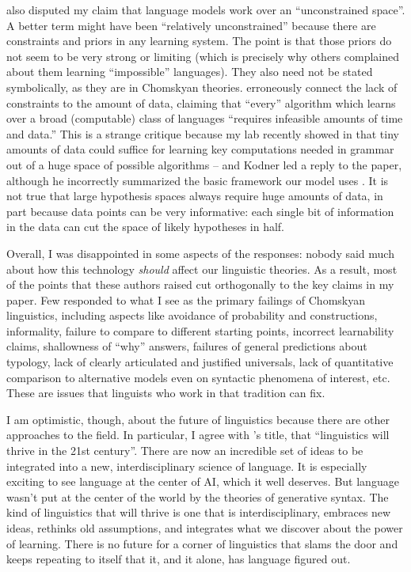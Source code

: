 \documentclass[output=paper,colorlinks,citecolor=brown]{langscibook}
\begin{document}
\citet{kodner2023linguistics} also disputed my claim that language models work over an ``unconstrained space''. A better term might have been ``relatively unconstrained'' because there are constraints and priors in any learning system. The point is that those priors do not seem to be very strong or limiting (which is precisely why others complained about them learning ``impossible'' languages). They also need not be stated symbolically, as they are in Chomskyan theories. \citet{kodner2023linguistics} erroneously connect the lack of constraints to the amount of data, claiming that ``every'' algorithm which learns over a broad (computable) class of languages ``requires infeasible amounts of time and data.'' This is a strange critique because my lab recently showed in \citet{yang2022one} that tiny amounts of data could suffice for learning key computations needed in grammar out of a huge space of possible algorithms -- and Kodner led a reply to the paper,  although he incorrectly summarized the basic framework our model uses \citep{piantadosi2022reply}. It is not true that large hypothesis spaces always require huge amounts of data, in part because data points can be very informative: each single bit of information in the data can cut the space of likely hypotheses in half. 

 
Overall, I was disappointed in some aspects of the responses: nobody said much about how this technology \textit{should} affect our linguistic theories. As a result, most of the points that these authors raised cut orthogonally to the key claims in my paper.  Few responded to what I see as the primary failings of Chomskyan linguistics, including aspects like avoidance of probability and constructions, informality, failure to compare to different starting points, incorrect learnability claims, shallowness of ``why'' answers, failures of general predictions about  typology, lack of clearly articulated and justified universals, lack of quantitative comparison to alternative models even on syntactic phenomena of interest, etc. These are issues that linguists who work in that tradition can fix. 

I am optimistic, though, about the future of linguistics because there are other approaches to the field. In particular, I agree with \citet{kodner2023linguistics}'s title, that ``linguistics will thrive in the 21st century''. There are now an incredible set of ideas to be integrated into a new, interdisciplinary science of language. It is especially exciting to see language at the center of AI, which it well deserves. But language wasn't put at the center of the world by the theories of generative syntax. The kind of linguistics that will thrive is one that is interdisciplinary, embraces new ideas, rethinks old assumptions, and integrates what we discover about the power of learning. There is no future for a corner of linguistics that slams the door and keeps repeating to itself that it, and it alone, has language figured out. 

{\sloppy
\printbibliography[heading=subbibliography,notkeyword=this]}
\end{document}
